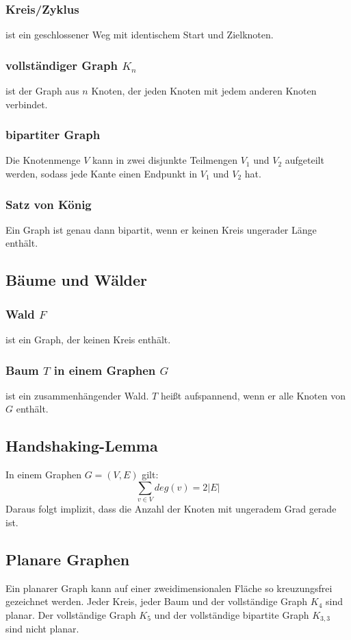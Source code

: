 \documentclass[10pt,a4paper,landscape]{article}
\begin{document}
\begin{multicols*}{2}
            \subsubsection*{ Kreis/Zyklus } ist ein geschlossener Weg mit identischem Start und Zielknoten.

            \subsubsection*{ vollständiger Graph $K_{n}$ } ist der Graph aus $n$ Knoten, der jeden Knoten mit jedem anderen Knoten verbindet.
            \subsubsection*{ bipartiter Graph } Die Knotenmenge $V$ kann in zwei disjunkte Teilmengen $V_1$ und $V_2$ aufgeteilt werden, sodass jede Kante einen 
            Endpunkt in $V_1$ und $V_2$ hat.
            \subsubsection*{ Satz von König }
            Ein Graph ist genau dann bipartit, wenn er keinen Kreis ungerader Länge enthält.

            \subsection{ Bäume und Wälder }
            \subsubsection*{ Wald $F$ } ist ein Graph, der keinen Kreis enthält.
            \subsubsection*{ Baum $T$ in einem Graphen $G$ } ist ein zusammenhängender Wald. $T$ heißt aufspannend, wenn er alle Knoten von $G$ enthält. 

            \subsection{ Handshaking-Lemma }
            In einem Graphen $G = (V, E)$ gilt:
            \[ \sum_{v\in V} deg(v) = 2|E| \]
            Daraus folgt implizit, dass die Anzahl der Knoten mit ungeradem Grad gerade ist.

            \subsection{ Planare Graphen }
            Ein planarer Graph kann auf einer zweidimensionalen Fläche so kreuzungsfrei gezeichnet werden. Jeder Kreis, 
            jeder Baum und der vollständige Graph $K_4$ sind planar. Der vollständige Graph $K_5$ und der vollständige 
            bipartite Graph $K_{3,3}$ sind nicht planar.

\end{multicols*}
\end{document}

